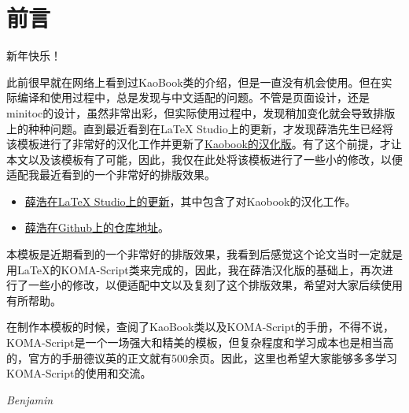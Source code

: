 \chapter*{前言}
\AddBackground

\noindent 新年快乐！

此前很早就在网络上看到过KaoBook类的介绍，但是一直没有机会使用。但在实际编译和使用过程中，总是发现与中文适配的问题。不管是页面设计，还是minitoc的设计，虽然非常出彩，但实际使用过程中，发现稍加变化就会导致排版上的种种问题。直到最近看到在\LaTeX{} Studio上的更新，才发现薛浩先生已经将该模板进行了非常好的汉化工作并更新了\href{https://ask.latexstudio.net/ask/article/747.html}{Kaobook的汉化版}。有了这个前提，才让本文以及该模板有了可能，因此，我仅在此处将该模板进行了一些小的修改，以便适配我最近看到的一个非常好的排版效果。

\begin{itemize}
	\item \href{https://ask.latexstudio.net/ask/article/747.html}{薛浩在\LaTeX{} Studio上的更新}，其中包含了对Kaobook的汉化工作。
	\item \href{https://ask.latexstudio.net/addons/ask/go/index?url=https%3A%2F%2Fgithub.com%2Fxuehao%2FkaobookCJKsc}{薛浩在Github上的仓库地址}。
\end{itemize}


本模板是近期看到的一个非常好的排版效果，我看到后感觉这个论文当时一定就是用\LaTeX 的KOMA-Script类来完成的，因此，我在薛浩汉化版的基础上，再次进行了一些小的修改，以便适配中文以及复刻了这个排版效果，希望对大家后续使用有所帮助。

在制作本模板的时候，查阅了KaoBook类以及KOMA-Script的手册，不得不说，KOMA-Script是一个一场强大和精美的模板，但复杂程度和学习成本也是相当高的，官方的手册德议英的正文就有500余页。因此，这里也希望大家能够多多学习KOMA-Script的使用和交流。

\begin{flushright}
	\textit{Benjamin}\\
	\zhtoday
\end{flushright}
